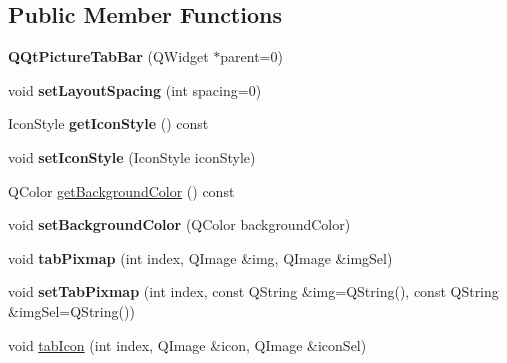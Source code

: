 \subsection*{Public Member Functions}
\begin{DoxyCompactItemize}
\item 
\mbox{\label{class_q_qt_picture_tab_bar_a906226a9eb5cc72d54a04568b76ce496}} 
{\bfseries Q\+Qt\+Picture\+Tab\+Bar} (Q\+Widget $\ast$parent=0)
\item 
\mbox{\label{class_q_qt_picture_tab_bar_a6b6083132fd0e70cd85dabbde863406f}} 
void {\bfseries set\+Layout\+Spacing} (int spacing=0)
\item 
\mbox{\label{class_q_qt_picture_tab_bar_a2554105d66022b8a2ea35966782bc637}} 
Icon\+Style {\bfseries get\+Icon\+Style} () const
\item 
\mbox{\label{class_q_qt_picture_tab_bar_adc5c055dcc3156b8acbc3222f5bbc169}} 
void {\bfseries set\+Icon\+Style} (Icon\+Style icon\+Style)
\item 
Q\+Color \mbox{\hyperlink{class_q_qt_picture_tab_bar_a75e42ec79228e9cb7ce7bddd375b5816}{get\+Background\+Color}} () const
\item 
\mbox{\label{class_q_qt_picture_tab_bar_af0d433202a4d1003d7662cd81c83a30e}} 
void {\bfseries set\+Background\+Color} (Q\+Color background\+Color)
\item 
\mbox{\label{class_q_qt_picture_tab_bar_abf6d6296deb24c0cd93e0460adfe87ab}} 
void {\bfseries tab\+Pixmap} (int index, Q\+Image \&img, Q\+Image \&img\+Sel)
\item 
\mbox{\label{class_q_qt_picture_tab_bar_aee9082b2cdb2058e2dae59568cc73302}} 
void {\bfseries set\+Tab\+Pixmap} (int index, const Q\+String \&img=Q\+String(), const Q\+String \&img\+Sel=Q\+String())
\item 
void \mbox{\hyperlink{class_q_qt_picture_tab_bar_a31191f17557f0b1842eeb5dea0d91b0e}{tab\+Icon}} (int index, Q\+Image \&icon, Q\+Image \&icon\+Sel)
\item 
\mbox{\label{class_q_qt_picture_tab_bar_a1089bf2aca1bcf11554d6a0c4ff8a3d7}} 

\end{DoxyCompactItemize}
